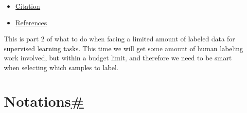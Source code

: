 \begin{itemize}
\begin{itemize}
    \begin{itemize}
    \tightlist
    \item
      \hyperref[core-sets-approach]{Core-sets Approach}
    \item
      \hyperref[diverse-gradient-embedding]{Diverse Gradient Embedding}
    \end{itemize}
  \item
    \hyperref[measuring-training-effects]{Measuring Training Effects}

    \begin{itemize}
    \tightlist
    \item
      \hyperref[quantify-model-changes]{Quantify Model Changes}
    \item
      \hyperref[forgetting-events]{Forgetting Events}
    \end{itemize}
  \item
    \hyperref[hybrid]{Hybrid}
  \end{itemize}
\item
  \hyperref[citation]{Citation}
\item
  \hyperref[references]{References}
\end{itemize}

This is part 2 of what to do when facing a limited amount of labeled data for supervised learning tasks. This time we will get some amount of human labeling work involved, but within a budget limit, and therefore we need to be smart when selecting which samples to label.

\section{\texorpdfstring{Notations\hyperref[notations]{\#}}{Notations\#}}\label{notations}

